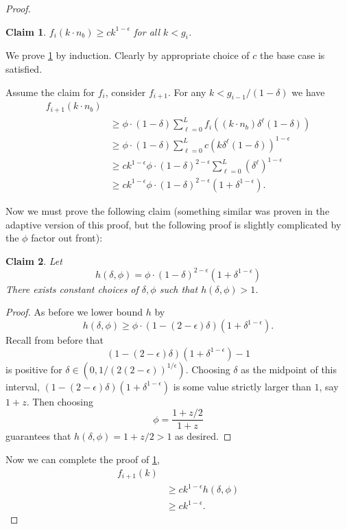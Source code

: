 \documentclass[twocolumn]{article}[10pt]
\newtheorem{clm}{Claim}
\begin{document}
\begin{proof}
  \begin{clm}
    \label{clm:fikinductionagain}
    $f_i(k \cdot n_b) \ge ck^{1-\epsilon}$ for all $k < g_i$.
  \end{clm}
  We prove \cref{clm:fikinductionagain} by induction. Clearly by
  appropriate choice of $c$ the base case is satisfied.

  Assume the claim for $f_i$, consider $f_{i+1}$. For any $k < g_{i-1}/(1-\delta)$ we have
  \begin{align*}
    f_{i+1}(k\cdot n_b) & \\
                  &\ge \phi\cdot(1-\delta)\sum_{\ell=0}^L f_i((k\cdot n_b)\delta^\ell (1-\delta))\\
                  &\ge \phi\cdot(1-\delta)\sum_{\ell=0}^L c (k\delta^\ell(1-\delta))^{1-\epsilon}\\
                  &\ge ck^{1-\epsilon} \phi\cdot(1-\delta)^{2-\epsilon}\sum_{\ell=0}^L (\delta^\ell)^{1-\epsilon}\\
                  &\ge ck^{1-\epsilon} \phi\cdot(1-\delta)^{2-\epsilon}( 1+\delta^{1-\epsilon}).
  \end{align*}

  Now we must prove the following claim (something similar was
  proven in the adaptive version of this proof, but the following
  proof is slightly complicated by the $\phi$ factor out front):
  \begin{clm}
    Let 
    $$h(\delta, \phi) = \phi\cdot (1-\delta)^{2-\epsilon}(1+\delta^{1-\epsilon})$$
    There exists constant choices of $\delta, \phi$ such that $h(\delta, \phi) > 1$.
  \end{clm}
  \begin{proof}
    As before we lower bound $h$ by 
    $$h(\delta, \phi) \ge \phi \cdot (1-(2-\epsilon)\delta)(1+\delta^{1-\epsilon}).$$
    Recall from before that 
    $$(1-(2-\epsilon)\delta)(1+\delta^{1-\epsilon}) -1$$ is positive for
    $\delta \in (0, 1/(2(2-\epsilon))^{1/\epsilon})$. Choosing $\delta$ as the
    midpoint of this interval, $(1-(2-\epsilon)\delta)(1+\delta^{1-\epsilon})$
    is some value strictly larger than $1$, say $1+z$. Then
    choosing $$\phi = \frac{1+z/2}{1+z}$$
    guarantees that $h(\delta, \phi) = 1+z/2 > 1$ as desired.
  \end{proof}

  Now we can complete the proof of \cref{clm:fikinductionagain}, 
  \begin{align*}
    f_{i+1}(k) & \\
               &\ge ck^{1-\epsilon} h(\delta, \phi)\\
               &\ge ck^{1-\epsilon}.
  \end{align*}


\end{proof}
\end{document}
